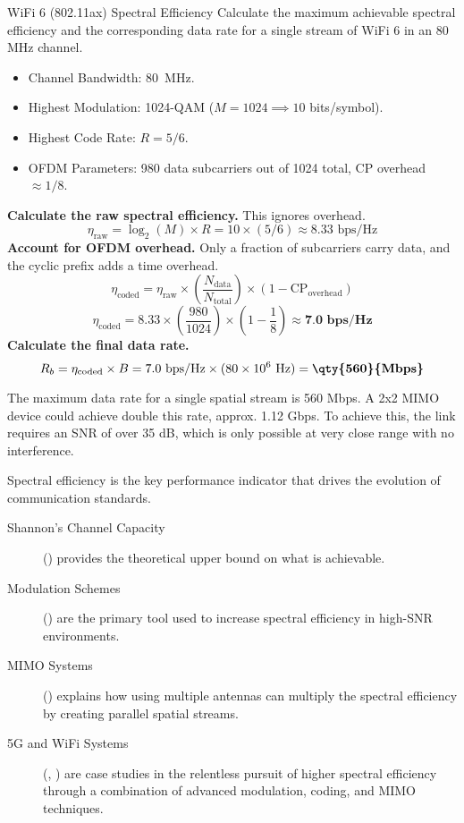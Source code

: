 \begin{workedexample}{WiFi 6 (802.11ax) Spectral Efficiency}
     Calculate the maximum achievable spectral efficiency and the corresponding data rate for a single stream of WiFi 6 in an 80 MHz channel.
    \begin{itemize}
        \item Channel Bandwidth: \qty{80}{MHz}.
        \item Highest Modulation: 1024-QAM ($M=1024 \implies 10$ bits/symbol).
        \item Highest Code Rate: $R=5/6$.
        \item OFDM Parameters: 980 data subcarriers out of 1024 total, CP overhead $\approx 1/8$.
    \end{itemize}
    \begin{derivationsteps}
        \step \textbf{Calculate the raw spectral efficiency.} This ignores overhead.
        \[ \eta_{\text{raw}} = \log_2(M) \times R = 10 \times (5/6) \approx 8.33 \text{ bps/Hz} \]
        \step \textbf{Account for OFDM overhead.} Only a fraction of subcarriers carry data, and the cyclic prefix adds a time overhead.
        \[ \eta_{\text{coded}} = \eta_{\text{raw}} \times \left(\frac{N_{\text{data}}}{N_{\text{total}}}\right) \times \left(1 - \text{CP}_{\text{overhead}}\right) \]
        \[ \eta_{\text{coded}} = 8.33 \times \left(\frac{980}{1024}\right) \times \left(1 - \frac{1}{8}\right) \approx \textbf{7.0 bps/Hz} \]
        \step \textbf{Calculate the final data rate.}
        \[ R_b = \eta_{\text{coded}} \times B = 7.0 \text{ bps/Hz} \times (80 \times 10^6 \text{ Hz}) = \textbf{\qty{560}{Mbps}} \]
    \end{derivationsteps}
     The maximum data rate for a single spatial stream is 560 Mbps. A 2x2 MIMO device could achieve double this rate, approx. 1.12 Gbps. To achieve this, the link requires an SNR of over 35 dB, which is only possible at very close range with no interference.
\end{workedexample}

\begin{importantbox}[title={Further Reading}]
    Spectral efficiency is the key performance indicator that drives the evolution of communication standards.
    \begin{description}
        \item[Shannon's Channel Capacity] () provides the theoretical upper bound on what is achievable.
        \item[Modulation Schemes] () are the primary tool used to increase spectral efficiency in high-SNR environments.
        \item[MIMO Systems] () explains how using multiple antennas can multiply the spectral efficiency by creating parallel spatial streams.
        \item[5G and WiFi Systems] (, ) are case studies in the relentless pursuit of higher spectral efficiency through a combination of advanced modulation, coding, and MIMO techniques.
    \end{description}
\end{importantbox}
